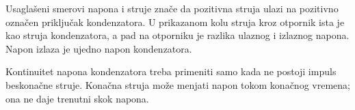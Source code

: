 Usaglašeni smerovi napona i struje znače da pozitivna struja ulazi na pozitivno označen priključak kondenzatora. U prikazanom kolu struja kroz otpornik ista je kao struja kondenzatora, a pad na otporniku je razlika ulaznog i izlaznog napona. Napon izlaza je ujedno napon kondenzatora.

Kontinuitet napona kondenzatora treba primeniti samo kada ne postoji impuls beskonačne struje. Konačna struja može menjati napon tokom konačnog vremena; ona ne daje trenutni skok napona.
